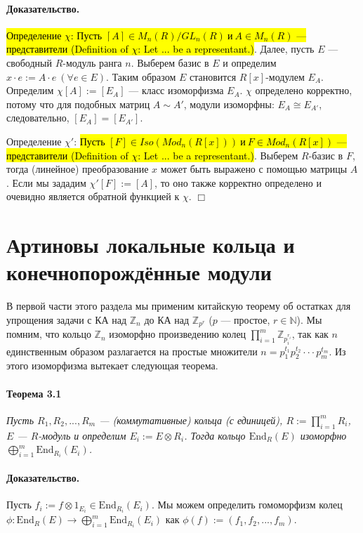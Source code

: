 \documentclass[a4paper,12pt]{article}
\newcommand{\Endom}{\text{End}}
\begin{document}
\paragraph{Доказательство.}
\hl{Определение $\chi$: Пусть $[A] \in M_n(R)/GL_n(R) ~ и ~ A \in M_n(R)$ --- представители (Definition of $\chi$: Let ... be a representant.)}.
Далее, пусть $E$ --- свободный $R$-модуль ранга $n$. Выберем базис в $E$ и определим $x \cdot e := A \cdot e ~ (\forall e \in E)$. Таким образом $E$ становится $R[x]$-модулем $E_A$. Определим $\chi [A] := [E_A]$ --- класс изоморфизма $E_A$. $\chi$ определено корректно, потому что для подобных матриц $A \sim A'$, модули изоморфны: $E_A \cong E_{A'}$, следовательно, $[E_A] = [E_{A'}]$.

Определение $\chi'$: \hl{Пусть $[F] \in Iso(Mod_n(R[x])) ~ и ~ F \in Mod_n(R[x])$ --- представители (Definition of $\chi$: Let ... be a representant.)}. Выберем $R$-базис в $F$, тогда (линейное) преобразование $x$ может быть выражено с помощью матрицы $A$. Если мы зададим $\chi'[F] := [A]$, то оно также корректно определено и очевидно является обратной функцией к $\chi$.  $\Box$

\section{Артиновы локальные кольца и конечнопорождённые модули}

В первой части этого раздела мы применим китайскую теорему об остатках для упрощения задачи с КА над $\mathbb{Z}_{n}$ до КА над $\mathbb{Z}_{p^r}$ ($p$ --- простое, $r \in \mathbb{N}$).
Мы помним, что кольцо $\mathbb{Z}_{n}$ изоморфно произведению колец $\prod_{i=1}^{m} { {\mathbb{Z}}_{{p_{i}^{r_{i}}}}}$, так как $n$ единственным образом разлагается на простые множители $n = p_1^{t_1} p_2^{t_2} \cdot \cdot \cdot p_m^{t_m}$. Из этого изоморфизма вытекает следующая теорема. 

\paragraph{Теорема 3.1}{\itshape
Пусть $R_1, R_2, ..., R_m$ --- (коммутативные) кольца (с единицей), $R:=\prod_{i=1}^{m}R_i$, $E$ --- $R$-модуль и определим $E_i := E \otimes R_i$. Тогда кольцо $\Endom_R(E)$ изоморфно $\bigoplus_{i=1}^{m}\Endom_{R_i}(E_i)$.
}
\paragraph{Доказательство.}
Пусть $f_i := f\otimes1_{E_i} \in \Endom_{R_i}(E_i)$. Мы можем определить гомоморфизм колец $\phi : \Endom_R(E) \rightarrow \bigoplus_{i=1}^{m} \Endom_{R_i} (E_i)$ как $\phi(f) := (f_1, f_2, ..., f_m)$. 
\end{document}

